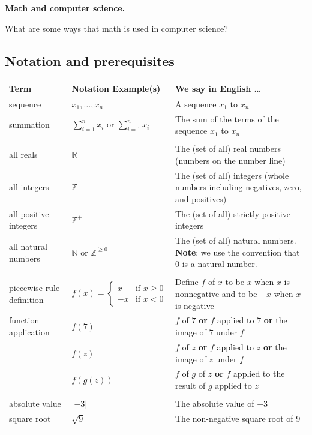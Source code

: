 \documentclass[12pt, oneside]{article}
\begin{document}
{\bf Math and computer science.}

What are some ways that math is used in computer science?

\vfill



\newpage


\subsection*{Notation and prerequisites}

\begin{center}
\begin{tabular}{|llp{9.8cm}|}
\hline
{\bf Term} & {\bf Notation Example(s)} & {\bf We say in English \ldots } \\
\hline
sequence & $x_1, \ldots, x_n$ & A sequence $x_1$ to $x_n$ \\
summation & $\sum_{i=1}^n x_i$ or $\displaystyle{\sum_{i=1}^n x_i}$ & The sum of the terms of the sequence $x_1$ to $x_n$ \\
&&\\
all reals & $\mathbb{R}$ & The (set of all) real numbers (numbers on the number line)\\
all integers & $\mathbb{Z}$ & The (set of all) integers (whole numbers including negatives, zero, and positives) \\
all positive integers & $\mathbb{Z}^+$ & The (set of all) strictly positive integers \\
all natural numbers & $\mathbb{N}$ or $\mathbb{Z}^{\geq 0}$ & The (set of all) natural numbers. {\bf Note}: we use the convention that $0$ is a natural number. \\
&&\\
piecewise rule definition & $f(x) = \begin{cases} x & \text{if~}x \geq 0 \\ -x & \text{if~}x<0\end{cases}$ &
Define $f$ of $x$ to be $x$ when $x$ is nonnegative and to be $-x$ when $x$ is negative\\
function application & $f(7)$ & $f$ of $7$ {\bf or} $f$ applied to $7$ {\bf or} the image of $7$ under $f$\\
                     & $f(z)$ & $f$ of $z$ {\bf or} $f$ applied to $z$ {\bf or} the image of $z$ under $f$\\
                     & $f(g(z))$ & $f$ of $g$ of $z$ {\bf or} $f$ applied to the result of $g$ applied to $z$ \\
&&\\
absolute value & $\lvert -3 \rvert$ & The absolute value of $-3$ \\
square root & $\sqrt{9}$ & The non-negative square root of $9$ \\
&&\\


\hline
\end{tabular}
\end{center}
\end{document}
